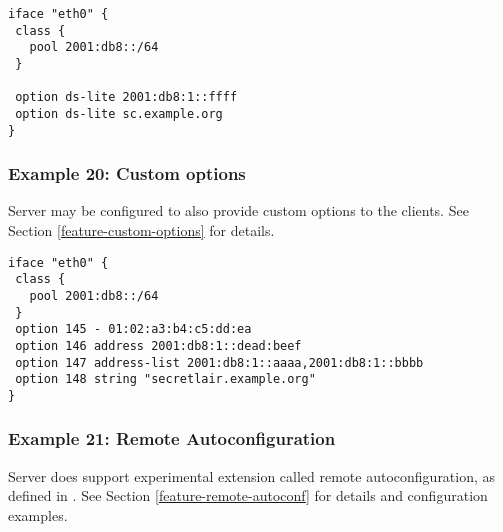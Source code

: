 \begin{lstlisting}
iface "eth0" {
 class {
   pool 2001:db8::/64
 }

 option ds-lite 2001:db8:1::ffff
 option ds-lite sc.example.org
}
\end{lstlisting}

\subsubsection{Example 20: Custom options}
\label{example-server-custom}
Server may be configured to also provide custom options to the
clients. See Section \ref{feature-custom-options} for details.

\begin{lstlisting}
iface "eth0" {
 class {
   pool 2001:db8::/64
 }
 option 145 - 01:02:a3:b4:c5:dd:ea
 option 146 address 2001:db8:1::dead:beef
 option 147 address-list 2001:db8:1::aaaa,2001:db8:1::bbbb
 option 148 string "secretlair.example.org"
}
\end{lstlisting}


\subsubsection{Example 21: Remote Autoconfiguration}
Server does support experimental extension called remote
autoconfiguration, as defined in \cite{draft-remote-autoconf}. See
Section \ref{feature-remote-autoconf} for details and configuration
examples.

